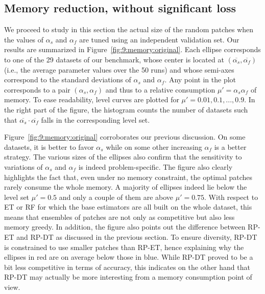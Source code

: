 \subsection{Memory reduction, without significant loss}
\label{sec:9:memory:noloss}

We proceed to study in this section the actual size of the random patches when
the values of $\alpha_s$ and $\alpha_f$ are tuned using an independent validation
set. Our results are summarized in Figure~\ref{fig:9:memory:original}. Each
ellipse corresponds to one of the 29 datasets of our benchmark, whose center is
located at $(\overline{\alpha_s}, \overline{\alpha_f})$ (i.e., the average parameter
values over the 50 runs) and whose semi-axes correspond to the standard
deviations of $\alpha_s$ and $\alpha_f$. Any point in the plot corresponds to a pair
$(\alpha_s, \alpha_f)$ and thus to a relative consumption $\mu' = \alpha_s \alpha_f$ of memory. To
ease readability, level curves are plotted for $\mu' = 0.01, 0.1, ..., 0.9$. In
the right part of the figure, the histogram counts the number of datasets such
that $\overline{\alpha_s}\cdot\overline{\alpha_f}$ falls in the corresponding level set.

Figure~\ref{fig:9:memory:original} corroborates our previous discussion. On some
datasets, it is better to favor $\alpha_s$ while on some other increasing $\alpha_f$ is
a better strategy. The various sizes of the ellipses also confirm that the
sensitivity to variations of $\alpha_s$ and $\alpha_f$ is indeed problem-specific. The
figure also clearly highlights the fact that, even under no memory constraint, the
optimal patches rarely consume the whole memory. A majority of ellipses indeed
lie below the level set $\mu'=0.5$ and only a couple of them are above
$\mu'=0.75$. With respect to ET or RF for which the base estimators are all built
on the whole dataset, this means that ensembles of patches are not only as
competitive but also less memory greedy. In addition, the figure also
points out the difference between RP-ET and RP-DT as discussed in the previous
section. To ensure diversity, RP-DT is constrained to use smaller patches than
RP-ET, hence explaining why the ellipses in red are on average below those in
blue. While RP-DT proved to be a bit less competitive in terms of accuracy,
this indicates on the other hand that RP-DT may actually be more interesting
from a memory consumption point of view.

